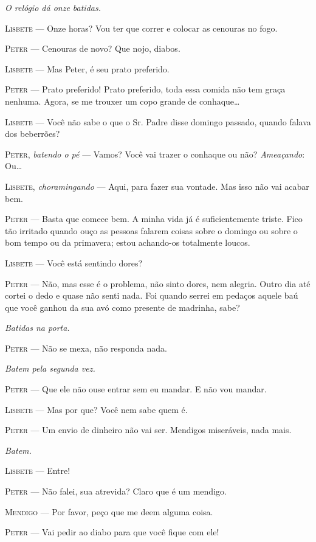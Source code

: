 \emph{O relógio dá onze batidas.}

\textsc{Lisbete} --- Onze horas? Vou ter que correr e colocar as cenouras no fogo.

\textsc{Peter} --- Cenouras de novo? Que nojo, diabos.

\textsc{Lisbete} --- Mas Peter, é seu prato preferido.

\textsc{Peter} --- Prato preferido! Prato preferido, toda essa comida não tem
graça nenhuma. Agora, se me trouxer um copo grande de conhaque\ldots{}

\textsc{Lisbete} --- Você não sabe o que o Sr. Padre disse domingo passado, quando
falava dos beberrões?

\textsc{Peter}, \emph{batendo o pé} --- Vamos? Você vai trazer o conhaque ou não?
\emph{Ameaçando}: Ou\ldots{}

\textsc{Lisbete}, \emph{choramingando} --- Aqui, para fazer sua vontade. Mas isso
não vai acabar bem.

\textsc{Peter} --- Basta que comece bem. A minha vida já é suficientemente triste.
Fico tão irritado quando ouço as pessoas falarem coisas sobre o domingo
ou sobre o bom tempo ou da primavera; estou achando-os totalmente
loucos.

\textsc{Lisbete} --- Você está sentindo dores?

\textsc{Peter} --- Não, mas esse é o problema, não sinto dores, nem alegria. Outro
dia até cortei o dedo e quase não senti nada. Foi quando serrei em
pedaços aquele baú que você ganhou da sua avó como presente de madrinha,
sabe?

\emph{Batidas na porta.}

\textsc{Peter} --- Não se mexa, não responda nada.

\emph{Batem pela segunda vez.}

\textsc{Peter} --- Que ele não ouse entrar sem eu mandar. E não vou mandar.

\textsc{Lisbete} --- Mas por que? Você nem sabe quem é.

\textsc{Peter} --- Um envio de dinheiro não vai ser. Mendigos miseráveis, nada
mais.

\emph{Batem.}

\textsc{Lisbete} --- Entre!

\textsc{Peter} --- Não falei, sua atrevida? Claro que é um mendigo.

\textsc{Mendigo} --- Por favor, peço que me deem alguma coisa.

\textsc{Peter} --- Vai pedir ao diabo para que você fique com ele!

